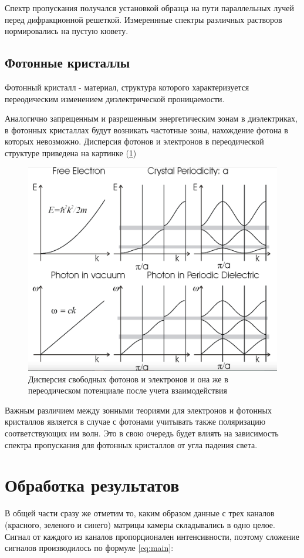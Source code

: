 \documentclass[a4paper, 12pt]{article}
\begin{document}
Спектр пропускания получался установкой образца на пути параллельных лучей перед дифракционной решеткой. Измереннные спектры различных растворов нормировались на пустую кювету.

\subsection{Фотонные кристаллы}

Фотонный кристалл - материал, структура которого характеризуется переодическим изменением диэлектрической проницаемости. 

Аналогично запрещенным и разрешенным энергетическим зонам в диэлектриках, в фотонных кристаллах будут возникать частотные зоны, нахождение фотона в которых невозможно. Дисперсия фотонов и электронов в переодической структуре приведена на картинке (\ref{fig:bandgap})

\begin{figure}[H]
	\centering
	\includegraphics[width=0.7\linewidth]{bandgap.png}
	\caption{Дисперсия свободных фотонов и электронов и она же в переодическом потенциале после учета взаимодействия}
	\label{fig:bandgap}
\end{figure}

Важным различием между зонными теориями для электронов и фотонных кристаллов является в случае с фотонами учитывать также поляризацию соответствующих им волн. Это в свою очередь будет влиять на зависимость спектра пропускания для фотонных кристаллов от угла падения света.

\section{Обработка результатов}

В общей части сразу же отметим то, каким образом данные с трех каналов (красного, зеленого и синего) матрицы камеры складывались в одно целое. Сигнал от каждого из каналов пропорционален интенсивности, поэтому сложение сигналов производилось по формуле \ref{eq:main}:
\end{document}
